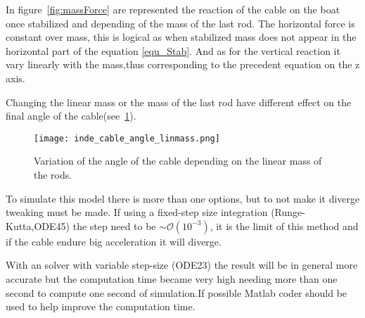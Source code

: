 In figure~\ref{fig:massForce} are represented the reaction of the cable on the boat once stabilized and depending of the mass of the last rod. The horizontal force is constant over mass, this is logical as when stabilized mass does not appear in the horizontal part of the equation \eqref{equ_Stab}. And as for the vertical reaction it vary linearly with the mass,thus corresponding to the precedent equation on the z axis.

Changing the linear mass or the mass of the last rod have different effect on the final angle of the cable(see~\ref{fig:linmassAngle}).

\begin{figure}[H]
\centering
    \texttt{[image: inde\_cable\_angle\_linmass.png]}
    \caption{Variation of the angle of the cable depending on the linear mass of the rods.}
    \label{fig:linmassAngle}
\end{figure}

To simulate this model there is more than one options, but to not make it diverge tweaking must be made.
If using a fixed-step size integration (Runge-Kutta,ODE45) the step need to be $\sim\mathcal{O}(10^{-3})$, it is the limit of this method and if the cable endure big acceleration it will diverge.

With an solver with variable step-size (ODE23) the result will be in general more accurate but the computation time became very high needing more than one second to compute one second of simulation.If possible Matlab coder should be used to help improve the computation time.
